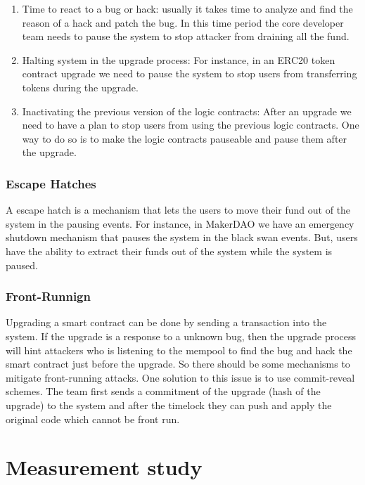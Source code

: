 \begin{enumerate}
  \item Time to react to a bug or hack: usually it takes time to analyze and find the reason of a hack and patch the bug. In this time period the core developer team needs to pause the system to stop attacker from draining all the fund.
  \item Halting system in the upgrade process: For instance, in an ERC20 token contract upgrade we need to pause the system to stop users from transferring tokens during the upgrade. 
  \item Inactivating the previous version of the logic contracts: After an upgrade we need to have a plan to stop users from using the previous logic contracts. One way to do so is to make the logic contracts pauseable and pause them after the upgrade. 
\end{enumerate}

\subsubsection{Escape Hatches}
A escape hatch is a mechanism that lets the users to move their fund out of the system in the pausing events. For instance, in MakerDAO we have an emergency shutdown mechanism that pauses the system in the black swan events. But, users have the ability to extract their funds out of the system while the system is paused.
\subsubsection{Front-Runnign}
Upgrading a smart contract can be done by sending a transaction into the system. If the upgrade is a response to a unknown bug, then the upgrade process will hint attackers who is listening to the mempool to find the bug and hack the smart contract just before the upgrade. So there should be some mechanisms to mitigate front-running attacks. One solution to this issue is to use commit-reveal schemes. The team first sends a commitment of the upgrade (hash of the upgrade) to the system and after the timelock they can push and apply the original code which cannot be front run. 





 \section{Measurement study}

